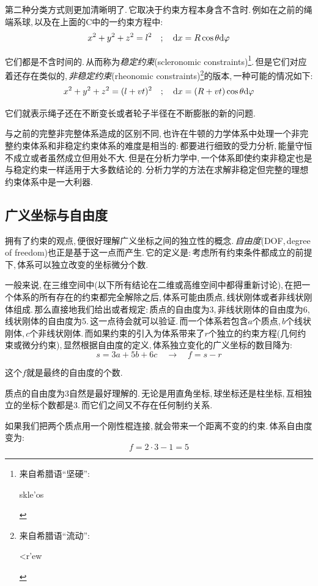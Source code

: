 第二种分类方式则更加清晰明了.\,它取决于约束方程本身含不含时.\,例如在之前的绳端系球,\,以及在上面的C中的一约束方程中:
\[x^2+y^2+z^2=l^2 \quad;\quad \textrm{d} x=R\cos\theta\textrm{d} \varphi\]

它们都是不含时间的.\,从而称为\emph{稳定约束}(scleronomic constraints)\footnote{来自希腊语``坚硬'':  \begin{greek} skle'os\end{greek}}.\,但是它们对应着还存在类似的,\,\emph{非稳定约束}(rheonomic constraints)\footnote{来自希腊语``流动'':  \begin{greek} <r'ew\end{greek}}的版本,\,一种可能的情况如下:
\[x^2+y^2+z^2=(l+vt)^2 \quad;\quad \textrm{d} x=(R+vt)\cos\theta\textrm{d} \varphi\]

它们就表示绳子还在不断变长或者轮子半径在不断膨胀的新的问题.

与之前的完整非完整体系造成的区别不同,\,也许在牛顿的力学体系中处理一个非完整约束体系和非稳定约束体系的难度是相当的:\,都要进行细致的受力分析,\,能量守恒不成立或者虽然成立但用处不大.\,但是在分析力学中,\,一个体系即使约束非稳定也是与稳定约束一样适用于大多数结论的.\,分析力学的方法在求解非稳定但完整的理想约束体系中是一大利器.

\subsection{广义坐标与自由度}

拥有了约束的观点,\,便很好理解广义坐标之间的独立性的概念.\,\emph{自由度}(DOF,\,degree of freedom)也正是基于这一点而产生.\,它的定义是:\,考虑所有约束条件都成立的前提下,\,体系可以独立改变的坐标微分个数.

一般来说,\,在三维空间中(以下所有结论在二维或高维空间中都得重新讨论),\,在把一个体系的所有存在的约束都完全解除之后,\,体系可能由质点,\,线状刚体或者非线状刚体组成.\,那么直接地我们给出或者规定:\,质点的自由度为3,\,非线状刚体的自由度为6,\,线状刚体的自由度为5.\,这一点待会就可以验证.\,而一个体系若包含$a$个质点,\,$b$个线状刚体,\,$c$个非线状刚体.\,而如果约束的引入为体系带来了$r$个独立的约束方程(几何约束或微分约束),\,显然根据自由度的定义,\,体系独立变化的广义坐标的数目降为:
\[s=3a+5b+6c\quad \longrightarrow \quad f=s-r\]

这个$f$就是最终的自由度的个数.

质点的自由度为3自然是最好理解的.\,无论是用直角坐标,\,球坐标还是柱坐标,\,互相独立的坐标个数都是3.\,而它们之间又不存在任何制约关系.

如果我们把两个质点用一个刚性棍连接,\,就会带来一个距离不变的约束.\,体系自由度变为:
\[f=2\cdot 3-1=5\]

